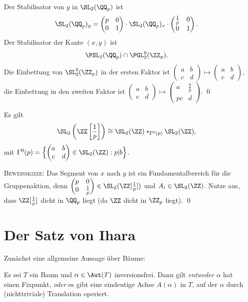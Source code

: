 Der Stabilisator von $y$ in $\SL_2(\QQ_p)$ ist
\[
\SL_2(\QQ_p)_y
=
\begin{pmatrix}
p & 0 \\
0 & 1
\end{pmatrix}\cdot
\SL_2(\QQ_p)_x \cdot
\begin{pmatrix}
\frac{1}{p} & 0 \\
0 & 1
\end{pmatrix}.
\]
Der Stabilisator der Kante $(x,y)$ ist
\[
\PSL_2(\QQ_p)\cap\PGL_2^0(\ZZ_p).
\]
Die Einbettung von
$\SL_2^0(\ZZ_p)$ in der ersten Faktor ist
$\begin{pmatrix} a&b\\ c&d\end{pmatrix}\mapsto
\begin{pmatrix} a&b\\ c&d\end{pmatrix}$, die Einbettung in den
zweiten Faktor ist
$\begin{pmatrix} a&b\\ c&d\end{pmatrix}\mapsto
\begin{pmatrix} a&\frac{b}{p}\\ pc&d\end{pmatrix}$.
\qed

\BEM Es gilt
\[
\SL_2\left(\ZZ\left[\frac{1}{p}\right]\right) \cong \SL_2(\ZZ) *_{\Gamma^0(p)} \SL_2(\ZZ),
\]
mit
$\Gamma^0(p)=
\Bigl\{\begin{pmatrix} a&b\\ c&d\end{pmatrix}\in\SL_2(\ZZ) :
p|b \Bigr\}$.

\textsc{Beweisskizze}: Das Segment von $x$ nach $y$ ist ein
Fundamentalbereich für die Gruppenaktion, denn
$\begin{pmatrix} p&0\\ 0&\frac{1}{p}\end{pmatrix}\in
\SL_2(\ZZ[\frac{1}{p}])$ und $A_i\in\SL_2(\ZZ)$.
Nutze aus, dass $\ZZ[\frac{1}{p}]$ dicht in $\QQ_p$ liegt
(da $\ZZ$ dicht in $\ZZ_p$ liegt).
\qed


\section{Der Satz von Ihara}\label{sec_ihara}

Zunächst eine allgemeine Aussage über Bäume:

\PROP\label{prop_fp_achse}
Es sei $T$ ein Baum und $\alpha\in\Aut(T)$ inversionsfrei.
Dann gilt \textsl{entweder} $\alpha$ hat einen Fixpunkt,
\textsl{oder} es gibt eine eindeutige Achse $A(\alpha)$ in $T$,
auf der $\alpha$ durch (nichttriviale) Translation operiert.

